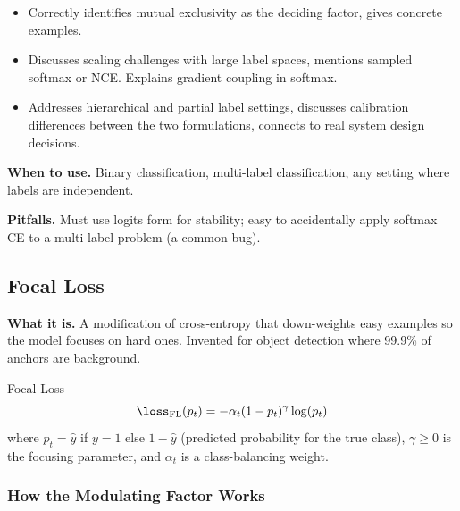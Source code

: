\begin{interviewq}
\goodgreat
\begin{itemize}
    \item {} Correctly identifies mutual exclusivity as the deciding factor, gives concrete examples.
    \item {} Discusses scaling challenges with large label spaces, mentions sampled softmax or NCE. Explains gradient coupling in softmax.
    \item {} Addresses hierarchical and partial label settings, discusses calibration differences between the two formulations, connects to real system design decisions.
\end{itemize}

\end{interviewq}

\textbf{When to use.} Binary classification, multi-label classification, any setting where labels are independent.

\textbf{Pitfalls.} Must use logits form for stability; easy to accidentally apply softmax CE to a multi-label problem (a common bug).

\subsection{Focal Loss}

\textbf{What it is.} A modification of cross-entropy that down-weights easy examples so the model focuses on hard ones. Invented for object detection where 99.9\% of anchors are background.

\begin{mathresult}{Focal Loss}
\begin{equation}
\loss_{\text{FL}}(p_t) = -\alpha_t (1 - p_t)^\gamma \log(p_t)
\end{equation}
where $p_t = \hat{y}$ if $y=1$ else $1-\hat{y}$ (predicted probability for the true class), $\gamma \geq 0$ is the focusing parameter, and $\alpha_t$ is a class-balancing weight.
\end{mathresult}

\subsubsection{How the Modulating Factor Works}

